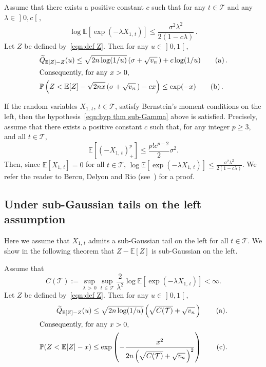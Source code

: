 \documentclass[AHL,Unicode,longabstracts,published]{cedram}
\newcommand{\bE}{\mathbb{E}}
\newcommand{\bP}{\mathbb{P}}
\newcommand{\cT}{\mathcal{T}}
\newcommand{\intervalleoo}[2]{\mathopen{]} #1\mathclose{}\mathpunct{},#2\mathclose{[}}
\let\oldtilde\tilde
\renewcommand*{\tilde}[1]{\mathchoice{\widetilde{#1}}{\widetilde{#1}}{\oldtilde{#1}}{\oldtilde{#1}}}
\begin{document}
\begin{theo}\label{thm:sub-Gamma}
Assume that there exists a positive constant $c$ such that for any $t\in\cT$ and any $\lambda\in\intervalleoo 0c$,
\begin{equation}\label{eqn:hyp thm sub-Gamma}
\log \bE[\exp(-\lambda X_{1,\,t})]\leq \frac{\sigma^2 \lambda^2}{2(1-c\lambda)}\,.
\end{equation}
Let $Z$ be defined by~\eqref{eqn:def Z}. Then for any $u\in\intervalleoo 01$,
\begin{align}
&\tilde Q_{\bE[Z]-Z}(u)\leq \sqrt{2n\log(1/u)}\left(\sigma+\sqrt{v_n}\,\right)+c\log(1/u) \tag{$\rm a$}\label{theo4.2.a}\,.
\\
\intertext{Consequently, for any $x>0$,}
&\bP\left(Z<\bE[Z]-\sqrt{2nx}\left(\sigma+\sqrt{v_n}\,\right)-cx\right)\leq \exp(-x) \tag{$\rm b$}\label{theo4.2.b}\,.
\end{align}
\end{theo}

\begin{rema}
If the random variables $X_{1,\,t}$, $t\in\cT$, satisfy Bernstein's moment conditions on the left, then the hypothesis~\eqref{eqn:hyp thm sub-Gamma} above is satisfied. Precisely, assume that there exists a positive constant $c$ such that, for any integer $p\geq 3$, and all $t\in\cT$,
\begin{equation}
\bE\left[(-X_{1,\,t})_+^p\right]\leq\frac{p! c^{p-2}}{2}\sigma^2.
\end{equation}
Then, since $\bE[X_{1,\,t}]=0$ for all $t\in\cT$, $\log \bE[\exp(-\lambda X_{1,\,t})]\leq \frac{\sigma^2 \lambda^2}{2(1-c\lambda)}$. We refer the reader to Bercu, Delyon and Rio (see~\cite[the proof of their Theorem~2.1]{BDR15}) for a proof.
\end{rema}

\subsection{Under sub-Gaussian tails on the left assumption}\label{subsection:sub-Gaussian}
Here we assume that $X_{1,\,t}$ admits a sub-Gaussian tail on the left for all $t\in\cT$. We show in the following theorem that $Z-\bE[Z]$ is sub-Gaussian on the left.

\begin{theo}\label{thm:sub-Gaussian}
Assume that
\begin{equation}\label{eqn:hyp thm sub-Gaussian}
C(\cT):=\sup_{\lambda\,>\,0}\sup_{t\,\in\,\cT}\frac {2}{\lambda^2}\log \bE\left[\exp(-\lambda X_{1,\,t})\right]<\infty.
\end{equation}
Let $Z$ be defined by~\eqref{eqn:def Z}. Then for any $u\in\intervalleoo 01$,
\begin{align}
\tilde Q_{\bE[Z]-Z}(u)
\leq \sqrt{2n\log(1/u)}\left(\sqrt{C(\cT)}+\sqrt{v_n}\,\right) \tag{$\rm a$}\label{theo4.4.a}.
\\
\intertext{Consequently, for any $x>0$,}
\bP(Z<\bE[Z]-x)\leq \exp\left(-\frac{x^2}{2n\left(\sqrt{C(\cT)}+\sqrt{v_n}\,\right)^2}\right)\tag{$\rm c$}\label{theo4.4.c}.
\end{align}
\end{theo}
\end{document}
